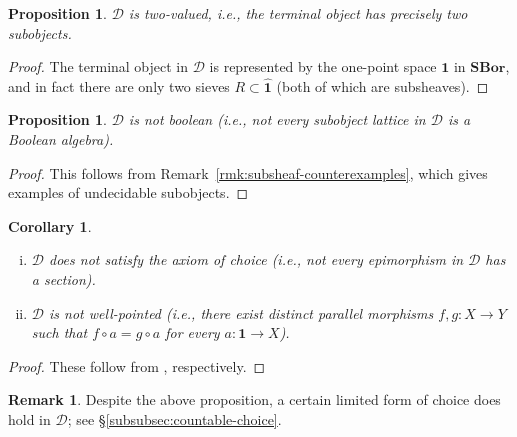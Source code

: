 \documentclass[11pt]{amsart}
\newcommand\cD{\mathcal{D}}
\newcommand\enumbelow{\ }
\newcommand\SBor{\mathbf{SBor}}
\newcommand\tm{\mathbf{1}}
\newcommand\wh[1]{\widehat{#1}}
\theoremstyle{definition}
\newtheorem{rmk}[defn]{Remark}
\theoremstyle{remark}
\theoremstyle{plain}
\newtheorem{propn}[defn]{Proposition}
\newtheorem{cor}[defn]{Corollary}
\begin{document}
\begin{propn}\label{propn:two-valued}
  \( \cD \) is two-valued, i.e., the terminal object has precisely two subobjects.
\end{propn}

\begin{proof}
  The terminal object in \( \cD \) is represented by the one-point space \( \tm \) in \( \SBor \), and in fact there are only two sieves \( R \subset \wh{\tm} \) (both of which are subsheaves).
\end{proof}

\begin{propn}
  \( \cD \) is not boolean (i.e., not every subobject lattice in \( \cD \) is a Boolean algebra).
\end{propn}

\begin{proof}
  This follows from Remark~\ref{rmk:subsheaf-counterexamples}, which gives examples of undecidable subobjects.
\end{proof}

\begin{cor}\enumbelow
  \begin{enumerate}[(i)]
  \item \( \cD \) does not satisfy the axiom of choice (i.e., not every epimorphism in \( \cD \) has a section).
  \item \( \cD \) is not well-pointed (i.e., there exist distinct parallel morphisms \( f,g \colon X \to Y \) such that \( f \circ a = g \circ a \) for every \( a \colon \tm \to X \)).
  \end{enumerate}
\end{cor}

\begin{proof}
  These follow from \cite[Theorem~5.23~and~Proposition~9.33]{johnstone-topos-theory}, respectively.
\end{proof}

\begin{rmk}
    Despite the above proposition, a certain limited form of choice does hold in \( \cD \); see \S\ref{subsubsec:countable-choice}.
\end{rmk}
\end{document}
